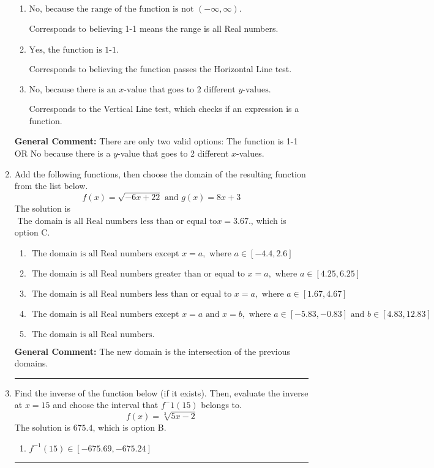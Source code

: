\documentclass{extbook}[14pt]
\newcommand{\litem}[1]{\item #1

\rule{\textwidth}{0.4pt}}
\begin{document}
\begin{enumerate}
{\begin{enumerate}[label=\Alph*.]
* This is the solution.
\item \( \text{No, because the range of the function is not $(-\infty, \infty)$.} \)

Corresponds to believing 1-1 means the range is all Real numbers.
\item \( \text{Yes, the function is 1-1.} \)

Corresponds to believing the function passes the Horizontal Line test.
\item \( \text{No, because there is an $x$-value that goes to 2 different $y$-values.} \)

Corresponds to the Vertical Line test, which checks if an expression is a function.
\end{enumerate}

\textbf{General Comment:} There are only two valid options: The function is 1-1 OR No because there is a $y$-value that goes to 2 different $x$-values.
}
\litem{
Add the following functions, then choose the domain of the resulting function from the list below.
\[ f(x) = \sqrt{-6x+22}  \text{ and } g(x) = 8x + 3 \]The solution is \( \text{ The domain is all Real numbers less than or equal to} x = 3.67. \), which is option C.\begin{enumerate}[label=\Alph*.]
\item \( \text{ The domain is all Real numbers except } x = a, \text{ where } a \in [-4.4, 2.6] \)


\item \( \text{ The domain is all Real numbers greater than or equal to } x = a, \text{ where } a \in [4.25, 6.25] \)


\item \( \text{ The domain is all Real numbers less than or equal to } x = a, \text{ where } a \in [1.67, 4.67] \)


\item \( \text{ The domain is all Real numbers except } x = a \text{ and } x = b, \text{ where } a \in [-5.83, -0.83] \text{ and } b \in [4.83, 12.83] \)


\item \( \text{ The domain is all Real numbers. } \)


\end{enumerate}

\textbf{General Comment:} The new domain is the intersection of the previous domains.
}
\litem{
Find the inverse of the function below (if it exists). Then, evaluate the inverse at $x = 15$ and choose the interval that $f^-1(15)$ belongs to.
\[ f(x) = \sqrt[3]{5 x - 2} \]The solution is \( 675.4 \), which is option B.\begin{enumerate}[label=\Alph*.]
\item \( f^{-1}(15) \in [-675.69, -675.24] \)


\end{enumerate}}
\end{enumerate}
\end{document}
